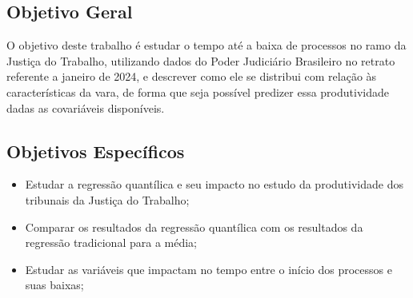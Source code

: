 \subsection{Objetivo Geral}
O objetivo deste trabalho é estudar o tempo até a baixa de processos no ramo da Justiça do Trabalho, utilizando dados do Poder Judiciário Brasileiro no retrato referente a janeiro de 2024, e descrever como ele se distribui com relação às características da vara, de forma que seja possível predizer essa produtividade dadas as covariáveis disponíveis.

\subsection{Objetivos Específicos}

\begin{itemize}
    \item Estudar a regressão quantílica e seu impacto no estudo da produtividade dos tribunais da Justiça do Trabalho;
    \item Comparar os resultados da regressão quantílica com os resultados da regressão tradicional para a média;
    \item Estudar as variáveis que impactam no tempo entre o início dos processos e suas baixas;
\end{itemize}
